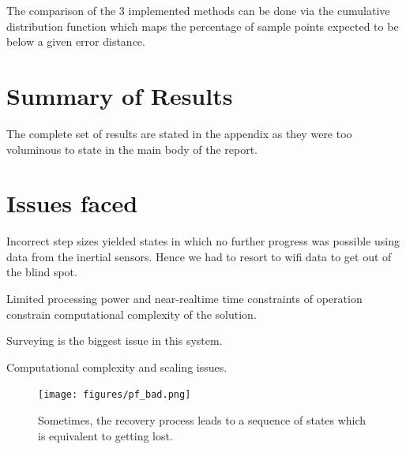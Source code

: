 The comparison of the 3 implemented methods can be done via the cumulative
distribution function which maps the percentage of sample points 
expected to be below a given error distance. 



\section{Summary of Results}

The complete set of results are stated in the appendix as they were too 
voluminous to state in the main body of the report.

\section{Issues faced}
Incorrect step sizes yielded states in which no further progress was possible
using data from the inertial sensors. Hence we had to resort to wifi data to get
out of the blind spot.

Limited processing power and near-realtime time constraints of operation
constrain computational complexity of the solution.

Surveying is the biggest issue in this system.

Computational complexity and scaling issues.

\begin{figure}
    \centering
    \texttt{[image: figures/pf\_bad.png]}
    \caption{Sometimes, the recovery process leads to a sequence of states 
        which is equivalent to getting lost.\label{fig:pf_bad}}
\end{figure}

